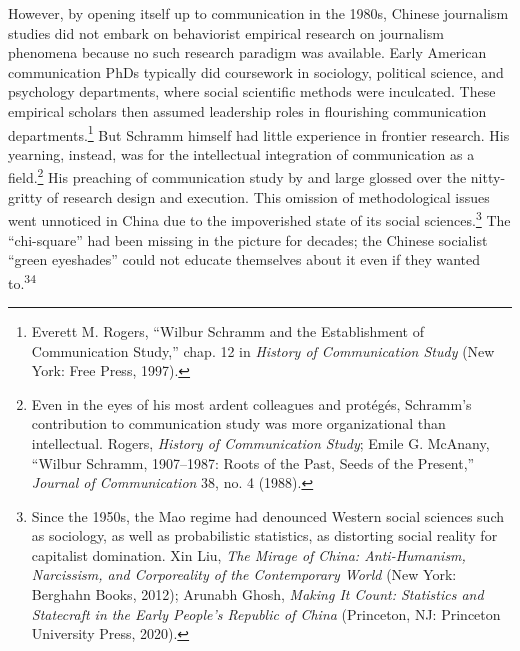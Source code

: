 \documentclass{tufte-handout}
\begin{document}
\begin{CJK*}{UTF8}{gbsn}
However, by opening itself up to communication in the 1980s, Chinese
journalism studies did not embark on behaviorist empirical research on
journalism phenomena because no such research paradigm was available.
Early American communication PhDs typically did coursework in sociology,
political science, and psychology departments, where social scientific
methods were inculcated. These empirical scholars then assumed
leadership roles in flourishing communication departments.\footnote{Everett
  M. Rogers, ``Wilbur Schramm and the Establishment of Communication
  Study,'' chap. 12 in \emph{History of Communication Study} (New York:
  Free Press, 1997).} But Schramm himself had little experience in
frontier research. His yearning, instead, was for the intellectual
integration of communication as a field.\footnote{Even in the eyes of
  his most ardent colleagues and protégés, Schramm's contribution to
  communication study was more organizational than intellectual. Rogers,
  \emph{History of Communication Study}; Emile G. McAnany, ``Wilbur
  Schramm, 1907--1987: Roots of the Past, Seeds of the Present,''
  \emph{Journal of Communication} 38, no. 4 (1988).} His preaching of
communication study by and large glossed over the nitty-gritty of
research design and execution. This omission of methodological issues
went unnoticed in China due to the impoverished state of its social
sciences.\footnote{Since the 1950s, the Mao regime had denounced Western
  social sciences such as sociology, as well as probabilistic
  statistics, as distorting social reality for capitalist domination.
  Xin Liu, \emph{The Mirage of China: Anti-Humanism, Narcissism, and
  Corporeality of the Contemporary World} (New York: Berghahn Books,
  2012); Arunabh Ghosh, \emph{Making It Count: Statistics and Statecraft
  in the Early People's Republic of China} (Princeton, NJ: Princeton
  University Press, 2020).} The ``chi-square'' had been missing in the
picture for decades; the Chinese socialist ``green eyeshades'' could not
educate themselves about it even if they wanted to.\textsuperscript{34}


\end{CJK*}
\end{document}
